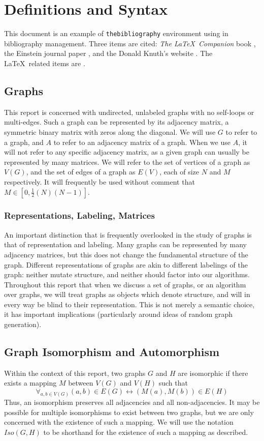 \documentclass[11pt,a4paper]{report}
\begin{document}
\chapter{Definitions and Syntax}



This document is an example of \texttt{thebibliography} environment using 
in bibliography management. Three items are cited: \textit{The \LaTeX\ Companion} 
book \cite{latexcompanion}, the Einstein journal paper \cite{einstein}, and the 
Donald Knuth's website \cite{knuthwebsite}. The \LaTeX\ related items are
\cite{latexcompanion,knuthwebsite}. 

\section{Graphs}
This report is concerned with undirected, unlabeled graphs with no self-loops or multi-edges.
Such a graph can be represented by its adjacency matrix, a symmetric binary matrix with zeros along the diagonal.
We will use $G$ to refer to a graph, and $A$ to refer to an adjacency matrix of a graph.
When we use $A$, it will not refer to any specific adjacency matrix, as a given graph can usually be represented by many matrices.
We will refer to the set of vertices of a graph as $V(G)$, and the set of edges of a graph as $E(V)$, each of size $N$ and $M$ respectively. 
It will frequently be used without comment that $M \in [0, \frac{1}{2}(N)(N-1)]$.

\subsection{Representations, Labeling, Matrices}
An important distinction that is frequently overlooked in the study of graphs is that of representation and labeling.
Many graphs can be represented by many adjacency matrices, but this does not change the fundamental structure of the graph.
Different representations of graphs are akin to different labelings of the graph: neither mutate structure, and neither should factor into our algorithms.
Throughout this report that when we discuss a set of graphs, or an algorithm over graphs, we will treat graphs as objects which denote structure, and will in every way be blind to their representation.
This is not merely a semantic choice, it has important implications (particularly around ideas of random graph generation).

\section{Graph Isomorphism and Automorphism}
Within the context of this report, two graphs $G$ and $H$ are isomorphic if there exists a mapping $M$ between $V(G)$ and $V(H)$ such that $$\forall_{a, b \in V(G)} (a, b) \in E(G) \leftrightarrow (M(a), M(b)) \in E(H)$$
Thus, an isomorphism preserves all adjacencies and all non-adjacencies.
It may be possible for multiple isomorphisms to exist between two graphs, but we are only concerned with the existence of such a mapping.
We will use the notation $Iso(G, H)$ to be shorthand for the existence of such a mapping as described.
\end{document}
